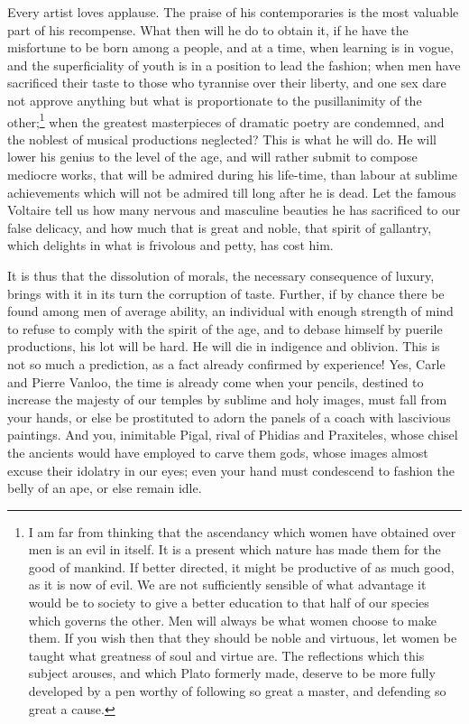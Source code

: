 Every artist loves applause. The praise of his contemporaries is the
most valuable part of his recompense. What then will he do to obtain
it, if he have the misfortune to be born among a people, and at a
time, when learning is in vogue, and the superficiality of youth is in
a position to lead the fashion; when men have sacrificed their taste
to those who tyrannise over their liberty, and one sex dare not
approve anything but what is proportionate to the pusillanimity of the
other;\footnote{I am far from thinking that the ascendancy which women
have obtained over men is an evil in itself. It is a present which
nature has made them for the good of mankind. If better directed, it
might be productive of as much good, as it is now of evil. We are not
sufficiently sensible of what advantage it would be to society to give
a better education to that half of our species which governs the
other. Men will always be what women choose to make them. If you wish
then that they should be noble and virtuous, let women be taught what
greatness of soul and virtue are. The reflections which this subject
arouses, and which Plato formerly made, deserve to be more fully
developed by a pen worthy of following so great a master, and
defending so great a cause.} when the greatest masterpieces of
dramatic poetry are condemned, and the noblest of musical productions
neglected? This is what he will do. He will lower his genius to the
level of the age, and will rather submit to compose mediocre works,
that will be admired during his life-time, than labour at sublime
achievements which will not be admired till long after he is dead. Let
the famous Voltaire tell us how many nervous and masculine beauties he
has sacrificed to our false delicacy, and how much that is great and
noble, that spirit of gallantry, which delights in what is frivolous
and petty, has cost him.

It is thus that the dissolution of morals, the necessary consequence
of luxury, brings with it in its turn the corruption of taste.
Further, if by chance there be found  among men of average
ability, an individual with enough strength of mind to refuse to
comply with the spirit of the age, and to debase himself by puerile
productions, his lot will be hard. He will die in indigence and
oblivion. This is not so much a prediction, as a fact already
confirmed by experience! Yes, Carle and Pierre Vanloo, the time is
already come when your pencils, destined to increase the majesty of
our temples by sublime and holy images, must fall from your hands, or
else be prostituted to adorn the panels of a coach with lascivious
paintings. And you, inimitable Pigal, rival of Phidias and Praxiteles,
whose chisel the ancients would have employed to carve them gods,
whose images almost excuse their idolatry in our eyes; even your hand
must condescend to fashion the belly of an ape, or else remain idle.

